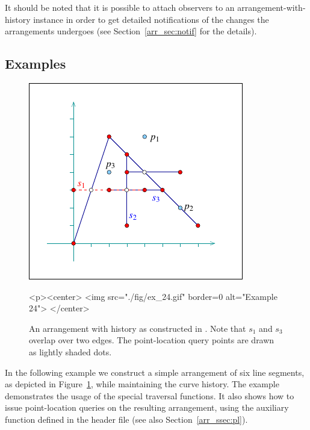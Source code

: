 It should be noted that it is possible to attach observers to an 
arrangement-with-history instance in order to get detailed notifications of
the changes the arrangements undergoes (see Section~\ref{arr_sec:notif} for
the details).

\subsection{Examples\label{arr_ssec:arr_hist_ex}}

\begin{figure}[t]
\begin{ccTexOnly}
  \begin{center}
  \includegraphics{Arrangement_2/fig/ex_24}
  \end{center}
\end{ccTexOnly}
\begin{ccHtmlOnly}
  <p><center>
  <img src="./fig/ex_24.gif" border=0 alt="Example 24">
  </center>
\end{ccHtmlOnly}
\caption{An arrangement with history as constructed in
. 
Note that $s_1$ and $s_3$ overlap over two edges. The point-location query
points are drawn as lightly shaded dots.\label{arr_fig:ex_24}}
\end{figure}

In the following example we construct a simple arrangement of six line
segments, as depicted in Figure~\ref{arr_fig:ex_24}, while maintaining 
the curve history. The example demonstrates the usage of the special
traversal functions. It also shows how to issue point-location queries
on the resulting arrangement, using the auxiliary function 
 defined in the header file 
 (see also Section~\ref{arr_ssec:pl}).

